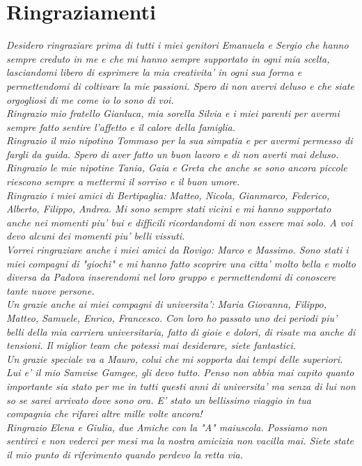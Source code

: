 \thispagestyle{empty}
\section{Ringraziamenti}
\textit{
Desidero ringraziare prima di tutti i miei genitori Emanuela e Sergio che hanno sempre creduto in me e che mi hanno sempre supportato in ogni mia scelta, lasciandomi libero di esprimere la mia creativita' in ogni sua forma e permettendomi di coltivare la mie passioni. Spero di non avervi deluso e che siate orgogliosi di me come io lo sono di voi.
\\
Ringrazio mio fratello Gianluca, mia sorella Silvia e i miei parenti per avermi sempre fatto sentire l'affetto e il calore della famiglia.
\\
Ringrazio il mio nipotino Tommaso per la sua simpatia e per avermi permesso di fargli da guida. Spero di aver fatto un buon lavoro e di non averti mai deluso. Ringrazio le mie nipotine Tania, Gaia e Greta che anche se sono ancora piccole riescono sempre a mettermi il sorriso e il buon umore.
\\
Ringrazio i miei amici di Bertipaglia: Matteo, Nicola, Gianmarco, Federico, Alberto, Filippo, Andrea. Mi sono sempre stati vicini e mi hanno supportato anche nei momenti piu' bui e difficili ricordandomi di non essere mai solo. A voi devo alcuni dei momenti piu' belli vissuti.
\\
Vorrei ringraziare anche i miei amici da Rovigo: Marco e Massimo. Sono stati i miei compagni di "giochi" e mi hanno fatto scoprire una citta' molto bella e molto diversa da Padova inserendomi nel loro gruppo e permettendomi di conoscere tante nuove persone.
\\
Un grazie anche ai miei compagni di universita': Maria Giovanna, Filippo, Matteo, Samuele, Enrico, Francesco. Con loro ho passato uno dei periodi piu' belli della mia carriera universitaria, fatto di gioie e dolori, di risate ma anche di tensioni. Il miglior team che potessi mai desiderare, siete fantastici.
\\
Un grazie speciale va a Mauro, colui che mi sopporta dai tempi delle superiori. Lui e' il mio Samvise Gamgee, gli devo tutto. Penso non abbia mai capito quanto importante sia stato per me in tutti questi anni di universita' ma senza di lui non so se sarei arrivato dove sono ora. E' stato un bellissimo viaggio in tua compagnia che rifarei altre mille volte ancora!
\\
Ringrazio Elena e Giulia, due Amiche con la "A" maiuscola. Possiamo non sentirci e non vederci per mesi ma la nostra amicizia non vacilla mai. Siete state il mio punto di riferimento quando perdevo la retta via.
}
